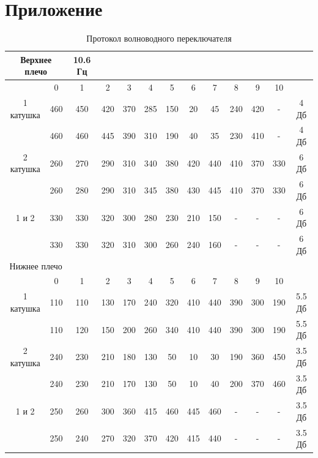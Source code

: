 \newpage
\section{Приложение}

\begin{table}[H]
    \centering
    \begin{tabular}{|c|c|c|c|c|c|c|c|c|c|c|c|c|}
    \hline
    \multicolumn{2}{|c|}{Верхнее плечо}& \multicolumn{1}{c|}{10.6 Гц} & & & & & & & & & &\\ \hline
    \multicolumn{1}{|c|}{} & 0 & 1 & 2 & 3  & 4 & 5 & 6 & 7 & 8 & 9 & 10 & \\ \hline
    \multicolumn{1}{|c|}{1 катушка}&460&450&420&370&285&150&20&45&240&420& -& \multicolumn{1}{c|}{4 Дб}\\ \hline
     &460&460&445&390&310&190&40&35&230&410& -& 4 Дб\\ \hline
    \multicolumn{1}{|c|}{2 катушка}&260&270&290&310&340&380&420&440&410&370&330& \multicolumn{1}{c|}{6 Дб}\\ \hline
     &260&280&290&310&345&380&430&445&410&370&330& \multicolumn{1}{c|}{6 Дб}\\ \hline
    \multicolumn{1}{|c|}{1 и 2}&330&330&320&300&280&230&210&150& -& -& -& \multicolumn{1}{c|}{6 Дб}\\ \hline
     &330&330&320&310&300&260&240&160& -& -& -& \multicolumn{1}{c|}{6 Дб} \\ \hline

    \hline
    \multicolumn{2}{|c|}{Нижнее плечо}& & & & & & & & & & & \\ \hline
    \multicolumn{1}{|c|}{} & \multicolumn{1}{c|}{0} & \multicolumn{1}{c|}{1} &  \multicolumn{1}{c|}{2}& 3  & 4 & 5 & 6 & 7 & 8 & 9 & 10 & \\ \hline
    1 катушка&110&110&130&170&240&320&410&440&390&300&190& 5.5 Дб\\ \hline
     &110&120&150&200&260&340&410&440&390&300&190& 5.5 Дб\\ \hline
    2 катушка&240&230&210&180&130&50&10&30&190&360&450& 3.5 Дб\\ \hline
     &240&230&210&170&130&50&10&40&200&370&460& 3.5 Дб\\ \hline
    1 и 2&250&260&300&360&415&460&445&460& -& -& -& 3.5 Дб\\ \hline
     &250&240&270&320&370&420&415&440& -& -& -& 3.5 Дб \\ \hline
    \end{tabular}
    \caption{Протокол волноводного переключателя}
    \label{tab:steel}
\end{table}

